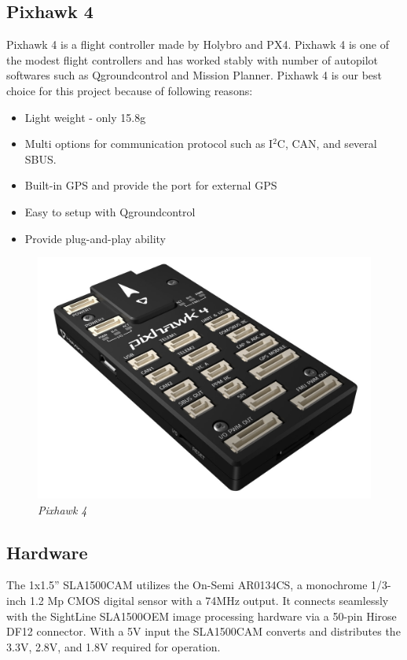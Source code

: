 \documentclass[11pt]{article}
\begin{document}
\subsection{Pixhawk 4}
Pixhawk 4 is a flight controller made by Holybro and PX4. Pixhawk 4 is one of the modest flight controllers and has worked stably with number of autopilot softwares such as Qgroundcontrol and Mission Planner. Pixhawk 4 is our best choice for this project because of following reasons:

\begin{itemize}

\item Light weight - only 15.8g
\item Multi options for communication protocol such as I$^2$C, CAN, and several SBUS.
\item Built-in GPS and provide the port for external GPS
\item Easy to setup with Qgroundcontrol
\item Provide plug-and-play ability     

\end{itemize}

\begin{figure}[h!bt]
\centering	
\includegraphics[width=4.5 in]{pixhawk4}
\caption{\textit{Pixhawk 4}}	
\end{figure}

\subsection{Hardware}

The 1x1.5” SLA1500CAM utilizes the On-Semi AR0134CS, a monochrome 1/3-inch 1.2 Mp CMOS digital sensor with a 74MHz output. It connects seamlessly with the SightLine SLA1500OEM image processing hardware via a 50-pin Hirose DF12 connector. With a 5V input the SLA1500CAM  converts and distributes the 3.3V, 2.8V, and 1.8V required for operation.
\end{document}
